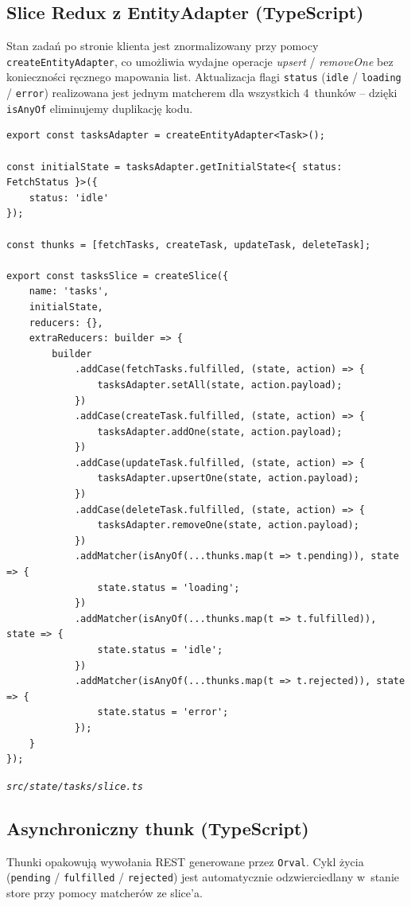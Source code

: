 \documentclass[12pt, a4paper, oneside]{article}
\newcommand{\codecaption}[1]{\par\vspace{-0.4em}\noindent\small\textit{#1}\par\vspace{0.3em}}
\begin{document}
\subsection{Slice Redux z EntityAdapter (TypeScript)}
Stan zadań po stronie klienta jest znormalizowany przy pomocy
\texttt{createEntityAdapter}, co umożliwia wydajne operacje
\emph{upsert} / \emph{removeOne} bez konieczności ręcznego mapowania list.
Aktualizacja flagi \texttt{status} (\texttt{idle} / \texttt{loading} /
\texttt{error}) realizowana jest jednym matcherem dla wszystkich
4~thunków -- dzięki \texttt{isAnyOf} eliminujemy duplikację kodu.

\begin{verbatim}
export const tasksAdapter = createEntityAdapter<Task>();

const initialState = tasksAdapter.getInitialState<{ status: FetchStatus }>({
    status: 'idle'
});

const thunks = [fetchTasks, createTask, updateTask, deleteTask];

export const tasksSlice = createSlice({
    name: 'tasks',
    initialState,
    reducers: {},
    extraReducers: builder => {
        builder
            .addCase(fetchTasks.fulfilled, (state, action) => {
                tasksAdapter.setAll(state, action.payload);
            })
            .addCase(createTask.fulfilled, (state, action) => {
                tasksAdapter.addOne(state, action.payload);
            })
            .addCase(updateTask.fulfilled, (state, action) => {
                tasksAdapter.upsertOne(state, action.payload);
            })
            .addCase(deleteTask.fulfilled, (state, action) => {
                tasksAdapter.removeOne(state, action.payload);
            })
            .addMatcher(isAnyOf(...thunks.map(t => t.pending)), state => {
                state.status = 'loading';
            })
            .addMatcher(isAnyOf(...thunks.map(t => t.fulfilled)), state => {
                state.status = 'idle';
            })
            .addMatcher(isAnyOf(...thunks.map(t => t.rejected)), state => {
                state.status = 'error';
            });
    }
});
\end{verbatim}
\codecaption{\texttt{src/state/tasks/slice.ts}}

\subsection{Asynchroniczny thunk (TypeScript)}
Thunki opakowują wywołania REST generowane przez \texttt{Orval}.
Cykl życia (\texttt{pending} / \texttt{fulfilled} / \texttt{rejected})
jest automatycznie odzwierciedlany w~stanie store przy pomocy matcherów
ze slice'a.
\end{document}
